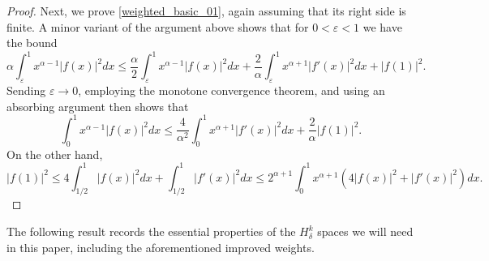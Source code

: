 \documentclass[11pt,reqno]{amsart}
\numberwithin{equation}{section}
\providecommand{\abs}[1]{\left\vert#1\right\vert}
\def\ep{\varepsilon}
\providecommand{\abs}[1]{\left\vert#1\right\vert}
\def\ep{\varepsilon}
\begin{document}
\begin{proof}
Next, we prove \eqref{weighted_basic_01}, again assuming that its right side is finite.  A minor variant of the argument above shows that for $0 < \ep < 1$ we have the bound 
\begin{equation}
 \alpha \int_\ep^1 x^{\alpha-1} \abs{f(x)}^2 dx \le \frac{\alpha}{2} \int_\ep^1 x^{\alpha-1} \abs{f(x)}^2 dx + \frac{2}{\alpha} \int_\ep^1 x^{\alpha+1} \abs{f'(x)}^2 dx + \abs{f(1)}^2.
\end{equation}
Sending $\ep \to 0$, employing the monotone convergence theorem, and using an absorbing argument then shows that 
\begin{equation}
  \int_0^1 x^{\alpha-1} \abs{f(x)}^2 dx \le   \frac{4}{\alpha^2} \int_0^1 x^{\alpha+1} \abs{f'(x)}^2 dx + \frac{2}{\alpha} \abs{f(1)}^2.
\end{equation}
On the other hand, 
\begin{equation}
 \abs{f(1)}^2 \le 4\int_{1/2}^1 \abs{f(x)}^2 dx + \int_{1/2}^1 \abs{f'(x)}^2 dx \le 2^{\alpha+1} \int_0^1 x^{\alpha+1} (4\abs{f(x)}^2 + \abs{f'(x)}^2) dx.
\end{equation}
\end{proof}
 
 
The following result records the essential properties of the $H^k_\delta$ spaces we will need in this paper, including the aforementioned improved weights.
\end{document}
